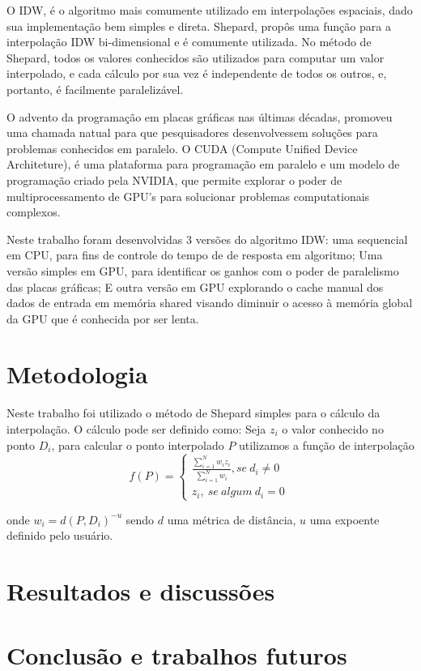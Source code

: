 \documentclass[conference]{acmsiggraph}
\begin{document}
O IDW, é o algoritmo mais comumente utilizado em interpolações espaciais, dado sua implementação bem simples e direta. Shepard, propôs uma função para a interpolação IDW bi-dimensional e é comumente utilizada. No método de Shepard, todos os valores conhecidos são utilizados para computar um valor interpolado, e cada cálculo por sua vez é independente de todos os outros, e, portanto, é facilmente paralelizável.

O advento da programação em placas gráficas nas últimas décadas, promoveu uma chamada natual para  que pesquisadores desenvolvessem soluções para problemas conhecidos em paralelo. O CUDA (Compute Unified Device Architeture), é uma plataforma para programação em paralelo e um modelo de programação criado pela NVIDIA, que permite explorar o poder de multiprocessamento de GPU's para solucionar problemas computationais complexos.

Neste trabalho foram desenvolvidas 3 versões do algoritmo IDW: uma sequencial em CPU, para fins de controle do tempo de de resposta em algoritmo; Uma versão simples em GPU, para identificar os ganhos com o poder de paralelismo das placas gráficas; E outra versão em GPU explorando o cache manual dos dados de entrada em memória shared visando diminuir o acesso à memória global da GPU que é conhecida por ser lenta.


\section{Metodologia}
Neste trabalho foi utilizado o método de Shepard simples para o cálculo da interpolação. O cálculo pode ser definido como: Seja $z_i$ o valor conhecido no ponto $D_i$, para calcular o ponto interpolado $P$ utilizamos a função de interpolação
\begin{equation}
f(P)=\left\{\begin{matrix}
\frac{\sum_{i=1}^{N}w_iz_i}{\sum_{i=1}^{N}w_i}, se\ d_i\neq 0
\\
z_i,\ se\ algum\ d_i = 0\ 

\end{matrix}\right.
\end{equation}

onde $w_i = d(P, D_i)^{-u}$ sendo $d$ uma métrica de distância, $u$ uma expoente definido pelo usuário.



\section{Resultados e discussões}


\section{Conclusão e trabalhos futuros}




\end{document}
